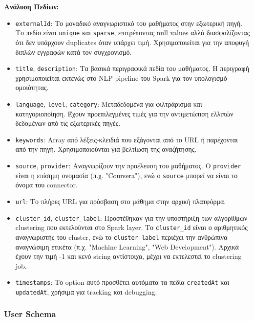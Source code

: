 \documentclass[a4paper,12pt]{article}
\begin{document}
\textbf{Ανάλυση Πεδίων:}

\begin{itemize}
    \item \texttt{externalId}: Το μοναδικό αναγνωριστικό του μαθήματος στην εξωτερική πηγή. Το πεδίο είναι \texttt{unique} και \texttt{sparse}, επιτρέποντας null values αλλά διασφαλίζοντας ότι δεν υπάρχουν duplicates όταν υπάρχει τιμή. Χρησιμοποιείται για την αποφυγή διπλών εγγραφών κατά τον συγχρονισμό.
    
    \item \texttt{title}, \texttt{description}: Τα βασικά περιγραφικά πεδία του μαθήματος. Η περιγραφή χρησιμοποιείται εκτενώς στο NLP pipeline του Spark για τον υπολογισμό ομοιότητας.
    
    \item \texttt{language}, \texttt{level}, \texttt{category}: Μεταδεδομένα για φιλτράρισμα και κατηγοριοποίηση. Έχουν προεπιλεγμένες τιμές για την αντιμετώπιση ελλιπών δεδομένων από τις εξωτερικές πηγές.
    
    \item \texttt{keywords}: Array από λέξεις-κλειδιά που εξάγονται από το URL ή παρέχονται από την πηγή. Χρησιμοποιούνται για βελτίωση της αναζήτησης.
    
    \item \texttt{source}, \texttt{provider}: Αναγνωρίζουν την προέλευση του μαθήματος. Ο \texttt{provider} είναι η επίσημη ονομασία (π.χ. "Coursera"), ενώ ο \texttt{source} μπορεί να είναι το όνομα του connector.
    
    \item \texttt{url}: Το πλήρες URL για πρόσβαση στο μάθημα στην αρχική πλατφόρμα.
    
    \item \texttt{cluster\_id}, \texttt{cluster\_label}: Προστέθηκαν για την υποστήριξη των αλγορίθμων clustering που εκτελούνται στο Spark layer. Το \texttt{cluster\_id} είναι ο αριθμητικός αναγνωριστής του cluster, ενώ το \texttt{cluster\_label} περιέχει την ανθρώπινα αναγνώσιμη ετικέτα (π.χ. "Machine Learning", "Web Development"). Αρχικά έχουν την τιμή -1 και κενό string αντίστοιχα, μέχρι να εκτελεστεί το clustering job.
    
    \item \texttt{timestamps}: Το option αυτό προσθέτει αυτόματα τα πεδία \texttt{createdAt} και \texttt{updatedAt}, χρήσιμα για tracking και debugging.
\end{itemize}

\subsubsection{User Schema}
\end{document}
